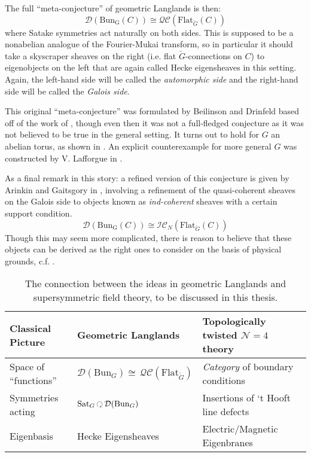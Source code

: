The full ``meta-conjecture'' of geometric Langlands is then:
\begin{equation}
	\mathcal D (\mathrm{Bun_G}(C)) \cong \mathcal{QC} (\mathrm{Flat}_{\check G} (C))
\end{equation}
where Satake symmetries act naturally on both sides. This is supposed to be a nonabelian analogue of the Fourier-Mukai transform, so in particular it should take a skyscraper sheaves on the right (i.e. flat $\check G$-connections on $C$) to eigenobjects on the left that are again called Hecke eigensheaves in this setting. Again, the left-hand side will be called the \emph{automorphic side} and the right-hand side will be called the \emph{Galois side}.

This original ``meta-conjecture'' was formulated by Beilinson and Drinfeld based off of the work of \cite{beilinson1991}, though even then it was not a full-fledged conjecture as it was not believed to be true in the general setting. It turns out to hold for $G$ an abelian torus, as shown in \cite{laumon1996}.
An explicit counterexample for more general $G$ was constructed by V. Lafforgue in \cite{lafforgue2009}.

As a final remark in this story: a refined version of this conjecture is given by Arinkin and Gaitsgory in \cite{arinkin2015}, involving a refinement of the quasi-coherent sheaves on the Galois side to objects known as \emph{ind-coherent} sheaves with a certain support condition. 
\begin{equation}
	\mathcal D (\mathrm{Bun_G}(C)) \cong \mathcal{IC}_{N} (\mathrm{Flat}_{\check G} (C))
\end{equation}
Though this may seem more complicated, there is reason to believe that these objects can be derived as the right ones to consider on the basis of physical grounds, c.f. \cite{elliott2017}. 

\begin{table}[h!]
	\centering
\begin{tabularx}{\textwidth}{|>{\hsize}Y|>{\hsize}Y|Y|}
	\hline
	Classical Picture & Geometric Langlands & Topologically twisted $\mathcal N=4$ theory\\
	\hline
	Space of ``functions'' & $\mathcal D (\mathrm{Bun}_G) \cong \, \mathcal{QC}(\mathrm{Flat}_{\check G})$ & \emph{Category} of boundary conditions \\
	Symmetries acting & $\mathrm{Sat}_G \lacts \mathcal D (\mathrm{Bun}_G)$ & Insertions of `t Hooft line defects\\
	Eigenbasis & Hecke Eigensheaves & Electric/Magnetic Eigenbranes\\
	\hline
	\end{tabularx}
\caption{The connection between the ideas in geometric Langlands and supersymmetric field theory, to be discussed in this thesis.}
\label{tab:langlands_and_physics}
\end{table}


